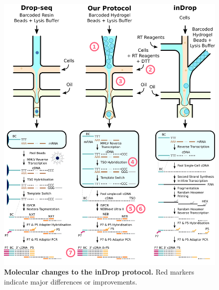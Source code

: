 \clearpage
\begin{figure}[ht]
\centerfloat
\includegraphics[width=17cm]{./ims/indrop_compar_combo.png}
\caption[Molecular changes to the inDrop protocol]{\textbf{Molecular changes to the inDrop protocol.} Red markers indicate major differences or improvements.}
 \label{fig:indrop_compar_combo}
\end{figure}

